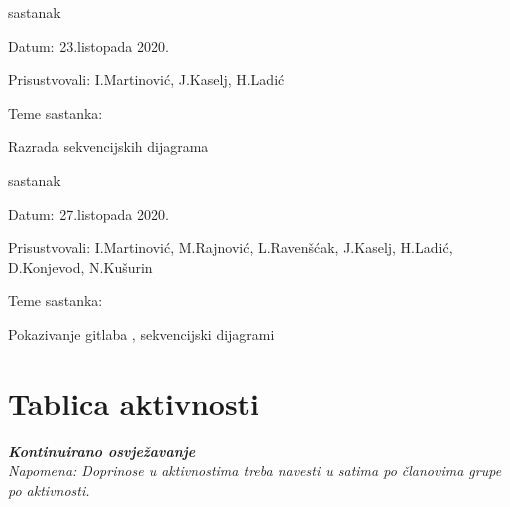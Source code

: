 \begin{packed_enum}
			
			\item sastanak
			\item[] \begin{packed_item}
				\item Datum: 23.listopada 2020.
				\item Prisustvovali: I.Martinović, J.Kaselj, H.Ladić
				\item Teme sastanka: 
				\begin{packed_item}
					\item   Razrada sekvencijskih dijagrama
				\end{packed_item}
			\end{packed_item}

                         \item sastanak
			\item[] \begin{packed_item}
				\item Datum: 27.listopada 2020.
				\item Prisustvovali: I.Martinović, M.Rajnović, L.Ravenšćak, J.Kaselj, H.Ladić, D.Konjevod, N.Kušurin
				\item Teme sastanka: 
				\begin{packed_item}
					\item   Pokazivanje gitlaba , sekvencijski dijagrami
				\end{packed_item}
			\end{packed_item}
			
			
		\end{packed_enum}
		
			
		\eject
		\section*{Tablica aktivnosti}
		
			\textbf{\textit{Kontinuirano osvježavanje}}\\
			
			 \textit{Napomena: Doprinose u aktivnostima treba navesti u satima po članovima grupe po aktivnosti.}
					
						
			

